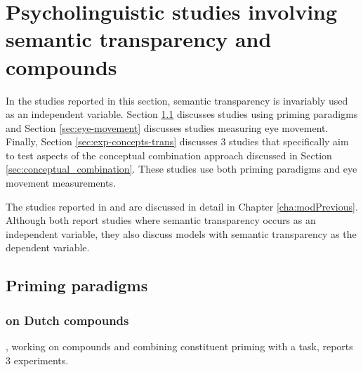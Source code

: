 \section[Psycholinguistic studies]{Psycholinguistic studies involving semantic transparency and compounds}
\label{sec:psycholinguistic-studies}

In the studies reported in this section, semantic transparency is
invariably used as an independent variable. Section
\ref{sec:priming-paradigms} discusses studies using priming paradigms
and Section
\ref{sec:eye-movement} discusses studies measuring eye
movement. Finally, Section \ref{sec:exp-concepts-trans} discusses
3 studies that specifically aim to test aspects of the conceptual
combination approach discussed in Section \ref{sec:conceptual_combination}. These studies
use both priming paradigms and eye movement measurements.

The studies reported in \citet{PhamandBaayen:2013} and
\citet{Marellietal:2014} are discussed in detail in Chapter
\ref{cha:modPrevious}. Although both report studies where semantic
transparency occurs as an independent variable, they also discuss
models with semantic transparency as the dependent variable. 


\subsection{Priming paradigms}
\label{sec:priming-paradigms}


\subsubsection{\citet{Sandra:1990} on Dutch compounds} 
\label{sec:sandra_1990}

\citet{Sandra:1990}, working on  compounds and combining
constituent priming with a  task, reports 3
experiments.

